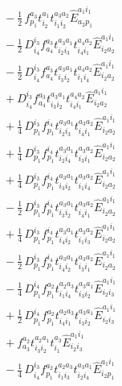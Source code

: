 \documentclass[11pt]{article}
\begin{document}
\begin{align}
&\quad - \tfrac{1}{2}\, f^{a_{3}}_{p_{1}} t^{a_{1}}_{i_{2}} t^{a_{3}a_{2}}_{i_{1}i_{2}} \hat{E}^{a_{1}i_{1}}_{a_{2}p_{1}} \\
&\quad - \tfrac{1}{2}\, D^{i_{3}}_{i_{4}} f^{a_{3}}_{a_{4}} t^{a_{3}a_{1}}_{i_{2}i_{3}} t^{a_{4}a_{2}}_{i_{4}i_{1}} \hat{E}^{a_{1}i_{1}}_{i_{2}a_{2}} \\
&\quad - \tfrac{1}{2}\, D^{i_{3}}_{i_{4}} f^{a_{3}}_{a_{4}} t^{a_{3}a_{1}}_{i_{3}i_{2}} t^{a_{4}a_{2}}_{i_{1}i_{4}} \hat{E}^{a_{1}i_{1}}_{i_{2}a_{2}} \\
&\quad + D^{i_{3}}_{i_{4}} f^{a_{3}}_{a_{4}} t^{a_{3}a_{1}}_{i_{3}i_{2}} t^{a_{4}a_{2}}_{i_{4}i_{1}} \hat{E}^{a_{1}i_{1}}_{i_{2}a_{2}} \\
&\quad + \tfrac{1}{4}\, D^{i_{3}}_{p_{1}} f^{i_{4}}_{p_{1}} t^{a_{3}a_{1}}_{i_{2}i_{3}} t^{a_{3}a_{2}}_{i_{4}i_{1}} \hat{E}^{a_{1}i_{1}}_{i_{2}a_{2}} \\
&\quad + \tfrac{1}{4}\, D^{i_{3}}_{p_{1}} f^{i_{4}}_{p_{1}} t^{a_{3}a_{1}}_{i_{2}i_{4}} t^{a_{3}a_{2}}_{i_{3}i_{1}} \hat{E}^{a_{1}i_{1}}_{i_{2}a_{2}} \\
&\quad + \tfrac{1}{4}\, D^{i_{3}}_{p_{1}} f^{i_{4}}_{p_{1}} t^{a_{3}a_{1}}_{i_{3}i_{2}} t^{a_{3}a_{2}}_{i_{1}i_{4}} \hat{E}^{a_{1}i_{1}}_{i_{2}a_{2}} \\
&\quad - \tfrac{1}{2}\, D^{i_{3}}_{p_{1}} f^{i_{4}}_{p_{1}} t^{a_{3}a_{1}}_{i_{3}i_{2}} t^{a_{3}a_{2}}_{i_{4}i_{1}} \hat{E}^{a_{1}i_{1}}_{i_{2}a_{2}} \\
&\quad + \tfrac{1}{4}\, D^{i_{3}}_{p_{1}} f^{i_{4}}_{p_{1}} t^{a_{3}a_{1}}_{i_{4}i_{2}} t^{a_{3}a_{2}}_{i_{1}i_{3}} \hat{E}^{a_{1}i_{1}}_{i_{2}a_{2}} \\
&\quad - \tfrac{1}{2}\, D^{i_{3}}_{p_{1}} f^{i_{4}}_{p_{1}} t^{a_{3}a_{1}}_{i_{4}i_{2}} t^{a_{3}a_{2}}_{i_{3}i_{1}} \hat{E}^{a_{1}i_{1}}_{i_{2}a_{2}} \\
&\quad - \tfrac{1}{4}\, D^{i_{4}}_{p_{1}} f^{a_{2}}_{p_{1}} t^{a_{2}a_{3}}_{i_{1}i_{4}} t^{a_{3}a_{1}}_{i_{3}i_{2}} \hat{E}^{a_{1}i_{1}}_{i_{2}i_{3}} \\
&\quad + \tfrac{1}{2}\, D^{i_{4}}_{p_{1}} f^{a_{2}}_{p_{1}} t^{a_{2}a_{3}}_{i_{4}i_{1}} t^{a_{3}a_{1}}_{i_{3}i_{2}} \hat{E}^{a_{1}i_{1}}_{i_{2}i_{3}} \\
&\quad + f^{a_{2}}_{a_{3}} t^{a_{2}a_{1}}_{i_{3}i_{2}} t^{a_{3}}_{i_{1}} \hat{E}^{a_{1}i_{1}}_{i_{2}i_{3}} \\
&\quad - \tfrac{1}{4}\, D^{i_{3}}_{i_{4}} f^{a_{2}}_{p_{1}} t^{a_{2}a_{3}}_{i_{1}i_{3}} t^{a_{3}a_{1}}_{i_{2}i_{4}} \hat{E}^{a_{1}i_{1}}_{i_{2}p_{1}} \\

\end{align}
\end{document}
